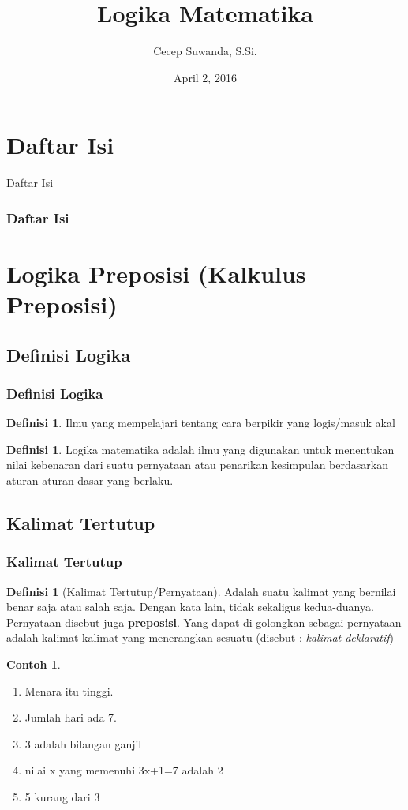 \documentclass[handout]{beamer}
\title[Logika Matematika]{Logika Matematika}
\author{Cecep Suwanda, S.Si.}
\date{April 2, 2016}
\institute{Universitas Bale Bandung}
\theoremstyle{definition}
\newtheorem{definisi}[theorem]{Definisi}
\theoremstyle{example}
\newtheorem{contoh}[theorem]{Contoh}
\begin{document}
\maketitle


\section*{Daftar Isi}
\begin{frame}[shrink]{Daftar Isi}
\frametitle{Daftar Isi}
\tableofcontents
\end{frame}

\section{Logika Preposisi (Kalkulus Preposisi)}
\subsection{Definisi Logika}
\begin{frame}
\frametitle{Definisi Logika}
    \begin{definisi}
   	  Ilmu yang mempelajari tentang cara berpikir yang logis/masuk akal 
    \end{definisi}
	\begin{definisi}
      Logika matematika adalah	ilmu yang digunakan untuk menentukan nilai kebenaran dari suatu pernyataan atau penarikan kesimpulan 
      berdasarkan aturan-aturan dasar yang berlaku.         
    \end{definisi}

\end{frame}

\subsection{Kalimat Tertutup}
\begin{frame}
\frametitle{Kalimat Tertutup}

 \begin{definisi}[Kalimat Tertutup/Pernyataan]
    Adalah suatu kalimat yang bernilai benar saja atau salah saja. Dengan kata lain, tidak sekaligus kedua-duanya. Pernyataan disebut juga \textbf{preposisi}. Yang dapat di golongkan sebagai pernyataan adalah kalimat-kalimat yang menerangkan sesuatu (disebut : \textit{kalimat deklaratif})
 \end{definisi}
 
\begin{contoh}	
	\begin{enumerate}
		\item Menara itu tinggi. 
		\item Jumlah hari ada 7.
		\item 3 adalah bilangan ganjil
		\item nilai x yang memenuhi 3x+1=7 adalah 2
		\item 5 kurang dari 3
	\end{enumerate}	 
\end{contoh}
\end{frame}
\end{document}
